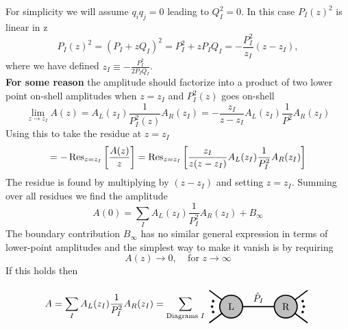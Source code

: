 \documentclass[a4paper,12pt]{article}
\begin{document}
%
For simplicity we will assume $q_iq_j=0$ leading to $Q_I^2=0$. In this case $P_I(z)^2$ is linear in z
%
\begin{equation}
P_I(z)^2=(P_I+zQ_I)^2=P_I^2+zP_I Q_I=-\frac{P_I^2}{z_I}(z-z_I),
\end{equation}
%
where we have defined $z_I\equiv-\frac{P_I^2}{2P_IQ_I}$.\\
%
\textbf{For some reason} the amplitude should factorize into a product of two lower point on-shell amplitudes when $z=z_I$ and $P_I^2(z)$ goes on-shell
%
\begin{equation}
\lim_{z\to z_I}A(z)=A_L(z_I)\frac{1}{P^2_I(z)}A_R(z_I)=-\frac{z_I}{z-z_I}A_L(z_I)\frac{1}{P^2}A_R(z_I)
\end{equation}
%
Using this to take the residue at $z=z_I$
%
\begin{equation}
=-\Res_{z=z_I}\left[\frac{A(z)}{z}\right]=
\Res_{z=z_I}\left[\frac{z_I}{z(z-z_I)}A_L(z_I)\frac{1}{P_I^2}A_R(z_I)\right]
\end{equation}
%
The residue is found by multiplying by $(z-z_I)$ and setting $z=z_I$. Summing over all residues we find the amplitude
%
\begin{equation}
A(0)=\sum_I A_L(z_I)\frac{1}{P_I^2}A_R(z_I)+B_{\infty}
\end{equation}
%
The boundary contribution $B_\infty$ has no similar general expression in terms of lower-point amplitudes and the simplest way to make it vanish is by requiring  
%
\begin{equation}
A(z)\to 0,~~~~~\text{for } z\to \infty
\end{equation}
%
If this holds then 
%
\begin{equation}
A=\sum_I A_L(z_I)\frac{1}{P_I^2}A_R(z_I)=\sum_{\text{Diagrams }I} 	\raisebox{-.5\height}{\begin{tikzpicture}[xscale=2,yscale=2]
\draw [style= very thick] (0.6,0.3) -- (1,0) node[at start, above] {};
\draw [style= very thick] (0.6,-0.3) -- (1,0) node[at start, below] {};
\draw [style= very thick] (1,0) -- (2,0) node[midway, above] {$\hat P_{I}$};
\draw [style= very thick] (2,0) -- (2.4,0.3) node[at end, above] {};
\draw [fill=black] (0.65,0) circle [radius=0.02];
\draw [fill=black] (0.67,0.1) circle [radius=0.02];
\draw [fill=black] (0.67,-0.1) circle [radius=0.02];
\draw [fill=black] (2.33,0) circle [radius=0.02];
\draw [fill=black] (2.31,0.1) circle [radius=0.02];
\draw [fill=black] (2.31,-0.1) circle [radius=0.02];
\draw [style= very thick] (2,0) -- (2.4,-0.3) node[at end, below] {};
\draw [style=very thick,fill=lightgray] (1,0) circle [radius=0.21] node[] {L};
\draw [style=very thick,fill=lightgray] (2,0) circle [radius=0.21] node[] {R};
\end{tikzpicture}}
\end{equation}
%
%
%
\end{document}
